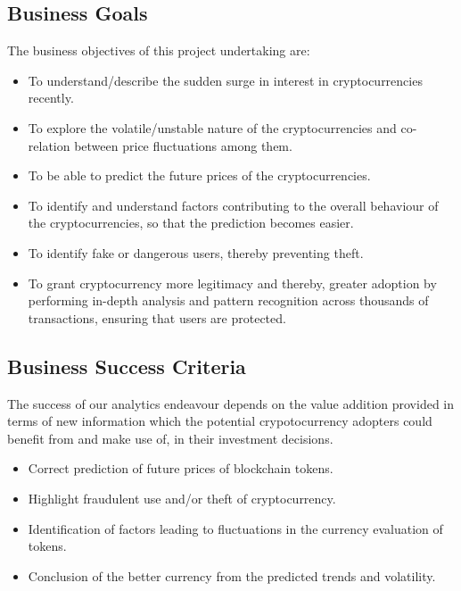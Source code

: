 \documentclass{article}
\begin{document}
\subsection{Business Goals}
The business objectives of this project undertaking are:
\begin{itemize}
    \item  To understand/describe the sudden surge in interest in cryptocurrencies recently.
    \item  To explore the volatile/unstable nature of the cryptocurrencies and co-relation between price fluctuations among them. 
    \item  To be able to predict the future prices of the cryptocurrencies.
    \item  To identify  and understand factors contributing to the overall behaviour of the cryptocurrencies, so that the prediction becomes easier.
    \item  To identify fake or dangerous users, thereby preventing theft.
    \item  To grant cryptocurrency more legitimacy and thereby, greater adoption by performing in-depth analysis and pattern recognition across thousands of transactions, ensuring that users are protected.
\end{itemize}

\subsection{Business Success Criteria}
The success of our analytics endeavour depends on the value addition provided in terms of new information which the potential crypotocurrency adopters could benefit from and make use of, in their investment decisions. 
\begin{itemize}
    \item Correct prediction of future prices of blockchain tokens.
    \item Highlight fraudulent use and/or theft of cryptocurrency.
    \item Identification of factors leading to fluctuations in the currency evaluation of tokens.
    \item Conclusion of the better currency from the predicted trends and volatility. 
\end{itemize}
\end{document}
